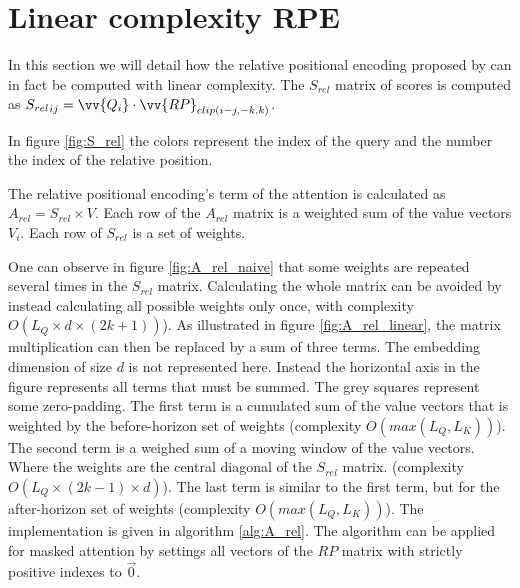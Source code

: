 \section{Linear complexity RPE}

In this section we will detail how the relative positional encoding
 proposed by \citet{shaw2018selfattention}
can in fact be computed with linear complexity. The $S_{rel}$ matrix of scores is computed as
${S_{rel}}_{ij} = \vv{Q_i} \cdot \vv{RP}_{clip(i-j, -k, k)}$.

In figure \ref{fig:S_rel} the colors represent the index of the query and the number the
index of the relative position.

The relative positional encoding's term of the attention is calculated as $A_{rel} = S_{rel} \times V$. Each row of the $A_{rel}$ matrix is a weighted sum of the value vectors $V_i$. Each row of $S_{rel}$ is a set of weights.

One can observe in figure \ref{fig:A_rel_naive} that some weights are repeated several times in the
$S_{rel}$ matrix. Calculating the whole matrix can be avoided by
instead calculating all possible weights only once, with complexity
$O \left(L_Q\times d\times(2k+1)\right)$). As illustrated in figure \ref{fig:A_rel_linear}, the matrix multiplication can then be replaced by a sum of three terms. The embedding dimension of size $d$ is not represented here. Instead the horizontal axis in the figure represents all terms that must be summed. The grey squares represent some zero-padding. The first term is a cumulated sum of the value vectors that is weighted  by the before-horizon set of weights (complexity $O(max(L_Q, L_K))$). The second term is a weighed sum of a moving window of the value vectors. Where the weights are the central diagonal of the $S_{rel}$ matrix. (complexity $O(L_Q \times (2k-1) \times d)$). The last term is similar to the first term, but for the after-horizon set of weights (complexity $O(max(L_Q, L_K))$). The implementation is given in algorithm \ref{alg:A_rel}. The algorithm can be applied for masked attention by settings all vectors of the $RP$ matrix with strictly positive indexes to $\vec{0}$.

\endinput
